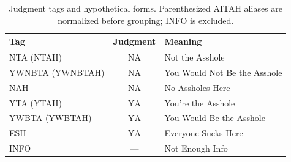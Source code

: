 \begin{table}[th]
  \centering
  \small
  \renewcommand{\arraystretch}{1.1} 
  \begin{tabular}{@{}p{2.5cm}cp{}@{}}
    \toprule
    \textbf{Tag} & \textbf{Judgment} & \textbf{Meaning} \\
    \midrule
    NTA {\footnotesize (NTAH)}      & $\mathrm{NA}$ & Not the Asshole \\
    YWNBTA {\footnotesize (YWNBTAH)}& $\mathrm{NA}$ & You Would Not Be the Asshole \\
    NAH      & $\mathrm{NA}$ & No Assholes Here \\
    \addlinespace[4pt]
    \rowcolor{gray!10} YTA {\footnotesize (YTAH)}      & $\mathrm{YA}$ & You're the Asshole \\
    \rowcolor{gray!10} YWBTA {\footnotesize (YWBTAH)}  & $\mathrm{YA}$ & You Would Be the Asshole \\
    \rowcolor{gray!10} ESH      & $\mathrm{YA}$ & Everyone Sucks Here \\
    \addlinespace[4pt]
    INFO     & ---           & Not Enough Info \\
    \bottomrule
  \end{tabular}
  \caption{Judgment tags and hypothetical forms. Parenthesized AITAH aliases
  are normalized before grouping; INFO is excluded.}
  \vspace{-30pt}
  \label{tab:tags}
\end{table}
